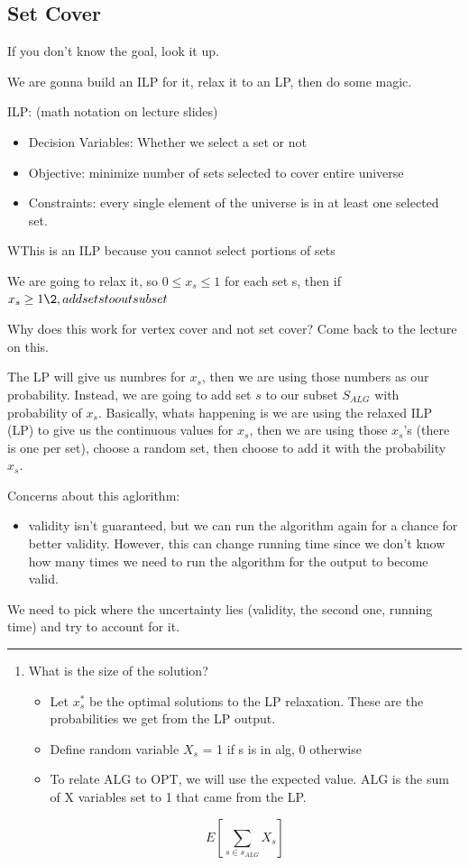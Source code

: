 \documentclass[11pt]{article}
\begin{document}
\subsection{Set Cover}
\label{sec:orge152a4d}

If you don't know the goal, look it up.

We are gonna build an ILP for it, relax it to an LP, then do some magic.


ILP:  (math notation on lecture slides)
\begin{itemize}
\item Decision Variables: Whether we select a set or not
\item Objective: minimize number of sets selected to cover entire universe
\item Constraints: every single element of the universe is in at least one selected set.
\end{itemize}

WThis is an ILP because you cannot select portions of sets

We are going to relax it, so \(0 \leq x_s \leq 1\) for each set s, then if  \(x_s \geq 1\2, add set s to out subset\)

Why does this work for vertex cover and not set cover? Come back to the lecture on this. 


The LP will give us numbres for \(x_s\), then we are using those numbers as our probability.
Instead, we are going to  add set \(s\) to our subset \(S_{ALG}\) with probability of \(x_s\).
Basically, whats happening is we are using the relaxed ILP (LP) to give us the continuous values for \(x_s\), then we are using those \(x_s\)'s (there is one per set), choose a random set, then choose to add it with the probability \(x_s\).

Concerns about this aglorithm:
\begin{itemize}
\item validity isn't guaranteed, but we can run the algorithm again for a chance for better validity. However, this can change running time since we don't know how many times we need to run the algorithm for the output to become valid.
\end{itemize}

We need to pick where the uncertainty lies (validity, the second one, running time) and try to account for it.

\noindent\rule{\textwidth}{0.5pt}
\begin{enumerate}
\item What is the size of the solution?
\begin{itemize}
\item Let \(x_s^*\) be the optimal solutions to the LP relaxation. These are the probabilities we get from the LP output.
\item Define random variable \(X_s\) = 1 if s is in alg, 0 otherwise
\item To relate ALG to OPT, we will use the expected value. ALG is the sum of X variables set to 1 that came from the LP.
\end{itemize}

\[ E[\sum_{s \in s_{ALG}} X_s]\]
\end{enumerate}
\end{document}
